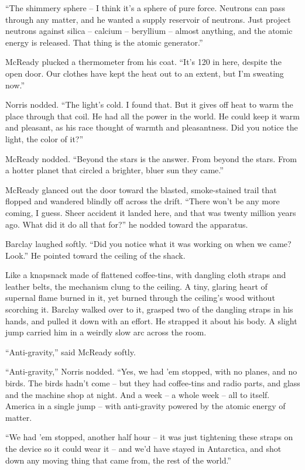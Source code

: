 \documentclass[letterpaper,openany,12pt]{memoir}		%
\begin{document}
``The shimmery sphere -- I think it's a sphere of pure force. Neutrons can pass
through any matter, and he wanted a supply reservoir of neutrons. Just project
neutrons against silica -- calcium -- beryllium -- almost anything, and the
atomic energy is released. That thing is the atomic generator.''

McReady plucked a thermometer from his coat. ``It's 120 in here, despite the
open door. Our clothes have kept the heat out to an extent, but I'm sweating
now.''

Norris nodded. ``The light's cold. I found that. But it gives off heat to warm
the place through that coil. He had all the power in the world. He could keep it
warm and pleasant, as his race thought of warmth and pleasantness. Did you
notice the light, the color of it?''

McReady nodded. ``Beyond the stars is the answer. From beyond the stars. From a
hotter planet that circled a brighter, bluer sun they came.''

McReady glanced out the door toward the blasted, smoke-stained trail that
flopped and wandered blindly off across the drift. ``There won't be any more
coming, I guess. Sheer accident it landed here, and that was twenty million
years ago. What did it do all that for?'' he nodded toward the apparatus.

Barclay laughed softly. ``Did you notice what it was working on when we came?
Look.'' He pointed toward the ceiling of the shack.

Like a knapsnack made of flattened coffee-tins, with dangling cloth straps and
leather belts, the mechanism clung to the ceiling. A tiny, glaring heart of
supernal flame burned in it, yet burned through the ceiling's wood without
scorching it. Barclay walked over to it, grasped two of the dangling straps in
his hands, and pulled it down with an effort. He strapped it about his body. A
slight jump carried him in a weirdly slow arc across the room.

``Anti-gravity,'' said McReady softly.

``Anti-gravity,'' Norris nodded. ``Yes, we had 'em stopped, with no planes, and
no birds. The birds hadn't come -- but they had coffee-tins and radio parts, and
glass and the machine shop at night. And a week -- a whole week -- all to
itself. America in a single jump -- with anti-gravity powered by the atomic
energy of matter.

``We had 'em stopped, another half hour -- it was just tightening these straps
on the device so it could wear it -- and we'd have stayed in Antarctica, and
shot down any moving thing that came from, the rest of the world.''
\end{document}

